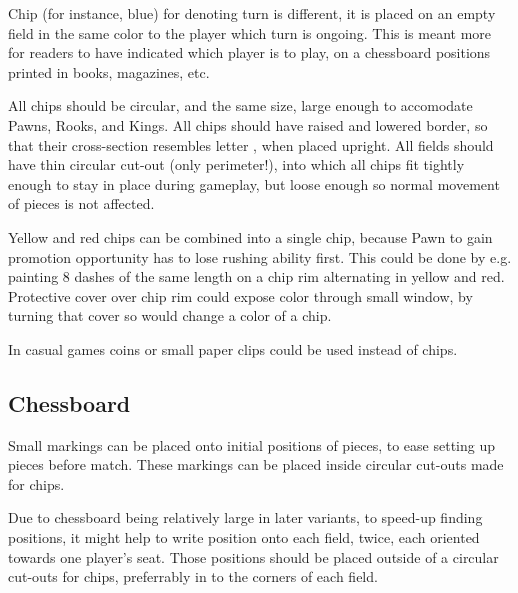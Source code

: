Chip (for instance, blue) for denoting turn is different, it is placed on an
empty field in the same color to the player which turn is ongoing. This is
meant more for readers to have indicated which player is to play, on a
chessboard positions printed in books, magazines, etc.

All chips should be circular, and the same size, large enough to accomodate
Pawns, Rooks, and Kings. All chips should have raised and lowered border, so
that their cross-section resembles letter , when placed upright.
All fields should have thin circular cut-out (only perimeter!), into which
all chips fit tightly enough to stay in place during gameplay, but loose
enough so normal movement of pieces is not affected.

Yellow and red chips can be combined into a single chip, because Pawn to gain
promotion opportunity has to lose rushing ability first. This could be done by
e.g. painting 8 dashes of the same length on a chip rim alternating in yellow
and red. Protective cover over chip rim could expose color through small window,
by turning that cover so would change a color of a chip.

In casual games coins or small paper clips could be used instead of chips.

\subsection*{Chessboard}
\label{sec:Remarks/Chessboard}

Small markings can be placed onto initial positions of pieces, to ease setting
up pieces before match. These markings can be placed inside circular cut-outs
made for chips.

Due to chessboard being relatively large in later variants, to speed-up finding
positions, it might help to write  position onto each field, twice,
each oriented towards one player's seat. Those  positions should be
placed outside of a circular cut-outs for chips, preferrably in to the corners
of each field.

\clearpage %

